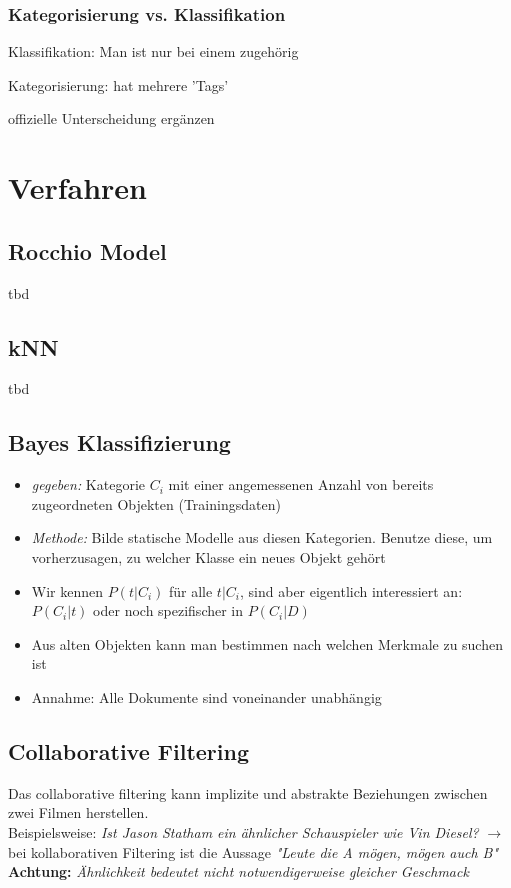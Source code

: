 \documentclass{report}
\theoremstyle{definition}
\theoremstyle{example}
\begin{document}
\subsubsection{Kategorisierung vs. Klassifikation}

Klassifikation: Man ist nur bei einem zugehörig

Kategorisierung: hat mehrere 'Tags'

offizielle Unterscheidung ergänzen

\section{Verfahren}

\subsection{Rocchio Model}
tbd

\subsection{kNN}
tbd

\subsection{Bayes Klassifizierung}
\begin{itemize}
   \item \textit{gegeben:} Kategorie $C_i$ mit einer angemessenen Anzahl von bereits zugeordneten Objekten (Trainingsdaten)
   \item \textit{Methode:} Bilde statische Modelle aus diesen Kategorien. Benutze diese, um vorherzusagen, zu welcher Klasse ein neues Objekt gehört
   \item Wir kennen $P(t|C_i)$ für alle $t|C_i$, sind aber eigentlich interessiert an: $P(C_i|t)$ oder noch spezifischer in $P(C_i|D)$
   \item Aus alten Objekten kann man bestimmen nach welchen Merkmale zu suchen ist 
   \item Annahme: Alle Dokumente sind voneinander unabhängig
\end{itemize}

\subsection{Collaborative Filtering}
Das collaborative filtering kann implizite und abstrakte Beziehungen zwischen zwei Filmen herstellen. \\
Beispielsweise: \textit{Ist Jason Statham ein ähnlicher Schauspieler wie Vin Diesel?} $\rightarrow$ bei kollaborativen Filtering ist die Aussage \textit{"Leute die A mögen, mögen auch B"}\\
\textbf{Achtung: } \textit{Ähnlichkeit bedeutet nicht notwendigerweise gleicher Geschmack}
\end{document}
